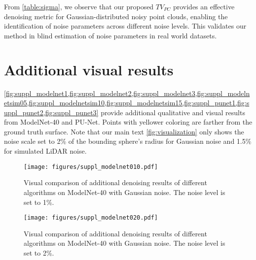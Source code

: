 From \cref{table:sigma}, we observe that our proposed $TV_{PC}$ provides an effective denoising metric for Gaussian-distributed noisy point clouds, enabling the identification of noise parameters across different noise levels. This validates our method in blind estimation of noise parameters in real world datasets.

\section{Additional visual results}
\cref{fig:suppl_modelnet1,fig:suppl_modelnet2,fig:suppl_modelnet3,fig:suppl_modelnetsim05,fig:suppl_modelnetsim10,fig:suppl_modelnetsim15,fig:suppl_punet1,fig:suppl_punet2,fig:suppl_punet3} provide additional qualitative and visual results from ModelNet-40 and PU-Net. Points with yellower coloring are farther from the ground truth surface. Note that our main text \cref{fig:visualization} only shows the noise scale set to 2\% of the bounding sphere’s radius for Gaussian noise and 1.5\% for simulated LiDAR noise. 

\begin{figure*}
\begin{center}
    \texttt{[image: figures/suppl\_modelnet010.pdf]}
\end{center}
\vspace{-0.05in}
\caption{Visual comparison of additional denoising results of different algorithms on ModelNet-40 with Gaussian noise. The noise level is set to 1\%.}
\label{fig:suppl_modelnet1}
\end{figure*}

\begin{figure*}
\begin{center}
    \texttt{[image: figures/suppl\_modelnet020.pdf]}
\end{center}
\vspace{-0.05in}
\caption{Visual comparison of additional denoising results of different algorithms on ModelNet-40 with Gaussian noise. The noise level is set to 2\%.}
\label{fig:suppl_modelnet2}
\end{figure*}

